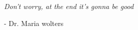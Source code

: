 
\clearpage
\vspace*{\fill}
\begin{center}
\begin{minipage}{.6\textwidth}
  \textit{Don't worry, at the end it's gonna be good}

  - Dr. Maria wolters
\end{minipage}
\end{center}
\vfill %
\clearpage
